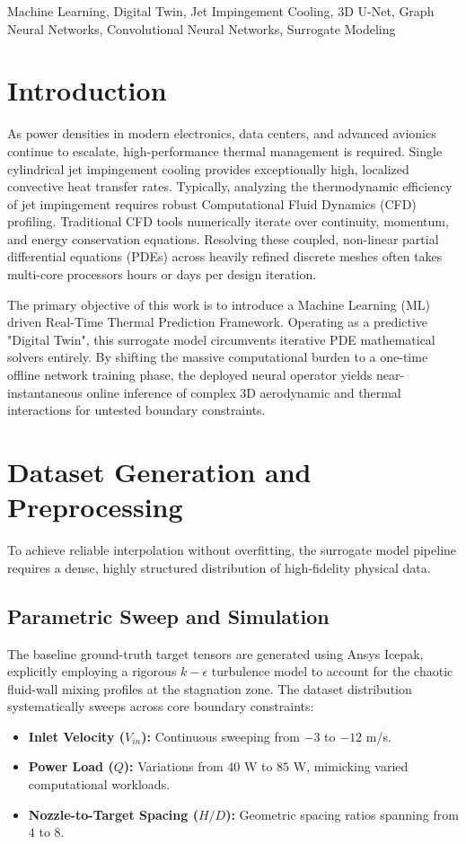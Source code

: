 \documentclass[conference]{IEEEtran}
\begin{document}
\begin{IEEEkeywords}
Machine Learning, Digital Twin, Jet Impingement Cooling, 3D U-Net, Graph Neural Networks, Convolutional Neural Networks, Surrogate Modeling
\end{IEEEkeywords}

\section{Introduction}
As power densities in modern electronics, data centers, and advanced avionics continue to escalate, high-performance thermal management is required. Single cylindrical jet impingement cooling provides exceptionally high, localized convective heat transfer rates. Typically, analyzing the thermodynamic efficiency of jet impingement requires robust Computational Fluid Dynamics (CFD) profiling. Traditional CFD tools numerically iterate over continuity, momentum, and energy conservation equations. Resolving these coupled, non-linear partial differential equations (PDEs) across heavily refined discrete meshes often takes multi-core processors hours or days per design iteration.

The primary objective of this work is to introduce a Machine Learning (ML) driven Real-Time Thermal Prediction Framework. Operating as a predictive "Digital Twin", this surrogate model circumvents iterative PDE mathematical solvers entirely. By shifting the massive computational burden to a one-time offline network training phase, the deployed neural operator yields near-instantaneous online inference of complex 3D aerodynamic and thermal interactions for untested boundary constraints. 

\section{Dataset Generation and Preprocessing}
To achieve reliable interpolation without overfitting, the surrogate model pipeline requires a dense, highly structured distribution of high-fidelity physical data.

\subsection{Parametric Sweep and Simulation}
The baseline ground-truth target tensors are generated using Ansys Icepak, explicitly employing a rigorous $k-\epsilon$ turbulence model to account for the chaotic fluid-wall mixing profiles at the stagnation zone. The dataset distribution systematically sweeps across core boundary constraints: 
\begin{itemize}
    \item \textbf{Inlet Velocity ($V_{in}$):} Continuous sweeping from $-3$ to $-12$ m/s.
    \item \textbf{Power Load ($Q$):} Variations from $40$ W to $85$ W, mimicking varied computational workloads.
    \item \textbf{Nozzle-to-Target Spacing ($H/D$):} Geometric spacing ratios spanning from $4$ to $8$.
\end{itemize}
\end{document}
